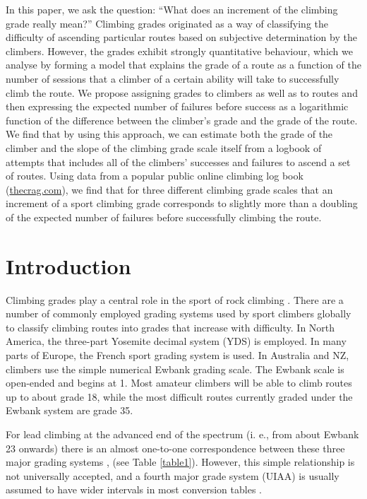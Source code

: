 \documentclass{article}
\begin{document}
{In this paper, we ask the question: ``What does an increment of the climbing grade really mean?''  Climbing grades originated as a way of classifying the difficulty of ascending particular routes based on subjective determination by the climbers.  However, the grades exhibit strongly quantitative behaviour, which we analyse by forming a model that explains the grade of a route as a function of the number of sessions that a climber of a certain ability will take to successfully climb the route. We propose assigning grades to climbers as well as to routes and then expressing the expected number of failures before success as a logarithmic function of the difference between the climber's grade and the grade of the route.  We find that by using this approach, we can estimate both the grade of the climber and the slope of the climbing grade scale itself from a logbook of attempts that includes all of the climbers' successes and failures to ascend a set of routes.  Using data from a popular public online climbing log book (\url{thecrag.com}), we find that for three different climbing grade scales that an increment of a sport climbing grade corresponds to slightly more than a doubling of the expected number of failures before successfully climbing the route.

\section*{Introduction}

Climbing grades play a central role in the sport of rock climbing \cite{delignieres1993psychophysical,draper2015comparative}. There are a number of commonly employed grading systems used by sport climbers globally to classify climbing routes into grades that increase with difficulty.  In North America, the three-part Yosemite decimal system (YDS) is employed.  In many parts of Europe, the French sport grading system is used.  In Australia and NZ, climbers use the simple numerical Ewbank grading scale. The Ewbank scale is open-ended and begins at 1. Most amateur climbers will be able to climb routes up to about grade 18, while the most difficult routes currently graded under the Ewbank system are grade 35. 

For lead climbing at the advanced end of the spectrum (i. e., from about Ewbank 23 onwards) there is an almost one-to-one correspondence between these three major grading systems \cite{draper2015comparative}, (see Table \ref{table1}).  However, this simple relationship is not universally accepted, and a fourth major grade system (UIAA) is usually assumed to have wider intervals in most conversion tables \cite{draper2015comparative}.

}
\end{document}
